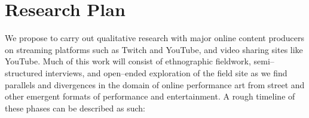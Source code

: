 \documentclass[10pt]{article}
\newcommand{\ali}[1]{{\color{Red}[al2: #1]}}
\newcommand{\topic}[1]{{\color{Blue}#1}}
\renewcommand{\topic}[1]{{#1}}
\begin{document}

\section*{Research Plan}
\topic{We propose to carry out qualitative research with major online content producers
on streaming platforms such as Twitch and YouTube, and video sharing sites like YouTube.}
Much of this work will consist of ethnographic fieldwork, semi--structured interviews, and
open--ended exploration of the field site as we find parallels and divergences in the domain
of online performance art from street and other emergent formats of performance and entertainment.
A rough timeline of these phases can be described as such:
\end{document}

